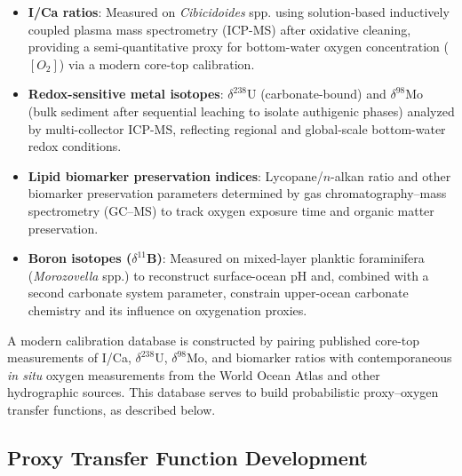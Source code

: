 \documentclass{article}
\begin{document}
\begin{itemize}
    \item \textbf{I/Ca ratios}: Measured on \textit{Cibicidoides} spp. using solution-based inductively coupled plasma mass spectrometry (ICP-MS) after oxidative cleaning, providing a semi-quantitative proxy for bottom-water oxygen concentration ($[O_2]$) via a modern core-top calibration.
    \item \textbf{Redox-sensitive metal isotopes}: $\delta^{238}$U (carbonate-bound) and $\delta^{98}$Mo (bulk sediment after sequential leaching to isolate authigenic phases) analyzed by multi-collector ICP-MS, reflecting regional and global-scale bottom-water redox conditions.
    \item \textbf{Lipid biomarker preservation indices}: Lycopane/$n$-alkan ratio and other biomarker preservation parameters determined by gas chromatography--mass spectrometry (GC--MS) to track oxygen exposure time and organic matter preservation.
    \item \textbf{Boron isotopes ($\delta^{11}$B)}: Measured on mixed-layer planktic foraminifera (\textit{Morozovella} spp.) to reconstruct surface-ocean pH and, combined with a second carbonate system parameter, constrain upper-ocean carbonate chemistry and its influence on oxygenation proxies.
\end{itemize}

A modern calibration database is constructed by pairing published core-top measurements of I/Ca, $\delta^{238}$U, $\delta^{98}$Mo, and biomarker ratios with contemporaneous \textit{in situ} oxygen measurements from the World Ocean Atlas and other hydrographic sources.
This database serves to build probabilistic proxy--oxygen transfer functions, as described below.

\subsection{Proxy Transfer Function Development}
\end{document}
